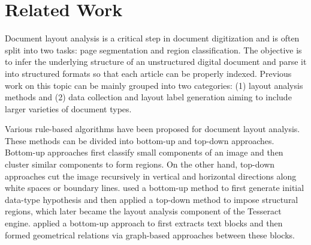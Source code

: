 \documentclass[letterpaper]{article} %
\begin{document}
 


\section{Related Work}
Document layout analysis is a critical step in document digitization and is often split into two tasks: page segmentation and region classification. The objective is to infer the underlying structure of an unstructured digital document and parse it into structured formats so that each article can be properly indexed. Previous work on this topic can be mainly grouped into two categories: (1) layout analysis methods and (2) data collection and layout label generation aiming to include larger varieties of document types. 

Various rule-based algorithms have been proposed for document layout analysis. These methods can be divided into bottom-up and top-down approaches. Bottom-up approaches first classify small components of an image and then cluster similar components to form regions. On the other hand, top-down approaches cut the image recursively in vertical and horizontal directions along white spaces or boundary lines. \cite{DBLP:conf/icdar/Smith09} used a bottom-up method to first generate initial data-type hypothesis and then applied a top-down method to impose structural regions, which later became the layout analysis component of the Tesseract engine. \cite{DBLP:journals/jodl/KlampflGJK14} applied a bottom-up approach to first extracts text blocks and then formed geometrical relations via graph-based approaches between these blocks. 
\end{document}
